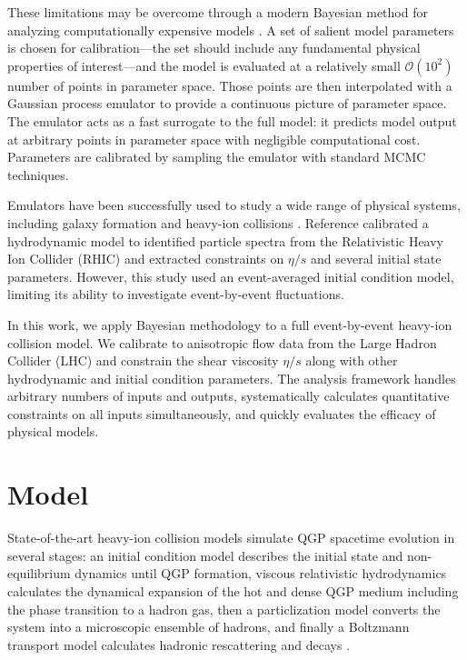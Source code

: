\documentclass[aps,prc,reprint,superscriptaddress,amsmath]{revtex4-1}
\begin{document}
These limitations may be overcome through a modern Bayesian method for analyzing computationally expensive models \cite{OHagan:2006ba,Higdon:2008cmc,Higdon:2014tva}.
A set of salient model parameters is chosen for calibration---the set should include any fundamental physical properties of interest---and the model is evaluated at a relatively small $\mathcal O(10^2)$ number of points in parameter space.
Those points are then interpolated with a Gaussian process emulator \cite{Rasmussen:2006gp} to provide a continuous picture of parameter space.
The emulator acts as a fast surrogate to the full model:
it predicts model output at arbitrary points in parameter space with negligible computational cost.
Parameters are calibrated by sampling the emulator with standard MCMC techniques.

Emulators have been successfully used to study a wide range of physical systems, including galaxy formation \cite{Gomez:2012ak} and heavy-ion collisions \cite{Novak:2013bqa}.
Reference \cite{Novak:2013bqa} calibrated a hydrodynamic model to identified particle spectra from the Relativistic Heavy Ion Collider (RHIC) and extracted constraints on $\eta/s$ and several initial state parameters.
However, this study used an event-averaged initial condition model, limiting its ability to investigate event-by-event fluctuations.

In this work, we apply Bayesian methodology to a full event-by-event heavy-ion collision model.
We calibrate to anisotropic flow data from the Large Hadron Collider (LHC) and constrain the shear viscosity $\eta/s$ along with other hydrodynamic and initial condition parameters.
The analysis framework handles arbitrary numbers of inputs and outputs, systematically calculates quantitative constraints on all inputs simultaneously, and quickly evaluates the efficacy of physical models.


\section{Model}

State-of-the-art heavy-ion collision models simulate QGP spacetime evolution in several stages:
an initial condition model describes the initial state and non-equilibrium dynamics until QGP formation, viscous relativistic hydrodynamics calculates the dynamical expansion of the hot and dense QGP medium including the phase transition to a hadron gas, then
a particlization model converts the system into a microscopic ensemble of hadrons, and finally a Boltzmann transport model calculates hadronic rescattering and decays \cite{Bass:2000ib,Teaney:2001av,Hirano:2005xf,Nonaka:2006yn,Petersen:2008dd,Song:2010mg,Schenke:2010rr,Shen:2014vra}.
\end{document}
